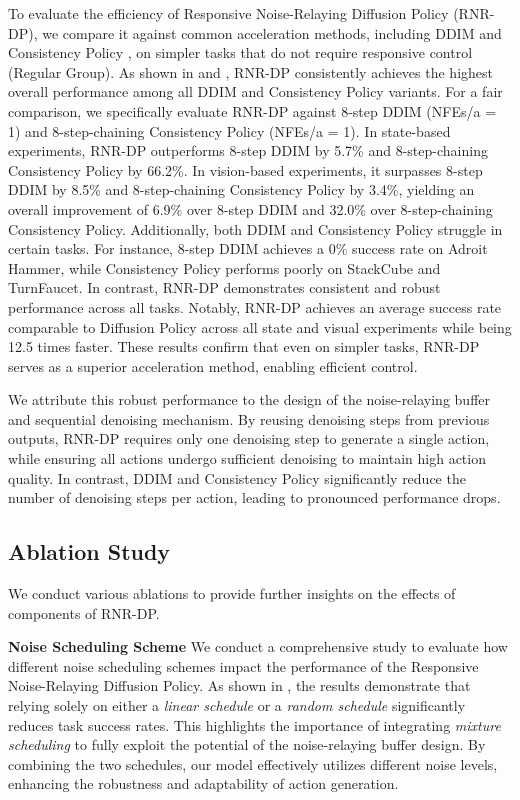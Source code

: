 To evaluate the efficiency of Responsive Noise-Relaying Diffusion Policy (RNR-DP), we compare it against common acceleration methods, including DDIM \citep{chi2023diffusion} and Consistency Policy \citep{prasad2024consistency}, on simpler tasks that do not require responsive control (Regular Group). As shown in  and , RNR-DP consistently achieves the highest overall performance among all DDIM and Consistency Policy variants. For a fair comparison, we specifically evaluate RNR-DP against 8-step DDIM (NFEs/a = 1) and 8-step-chaining Consistency Policy (NFEs/a = 1). In state-based experiments, RNR-DP outperforms 8-step DDIM by 5.7\% and 8-step-chaining Consistency Policy by 66.2\%. In vision-based experiments, it surpasses 8-step DDIM by 8.5\% and 8-step-chaining Consistency Policy by 3.4\%, yielding an overall improvement of 6.9\% over 8-step DDIM and 32.0\% over 8-step-chaining Consistency Policy. Additionally, both DDIM and Consistency Policy struggle in certain tasks. For instance, 8-step DDIM achieves a $0\%$ success rate on Adroit Hammer, while Consistency Policy performs poorly on StackCube and TurnFaucet. In contrast, RNR-DP demonstrates consistent and robust performance across all tasks. Notably, RNR-DP achieves an average success rate comparable to Diffusion Policy across all state and visual experiments while being 12.5 times faster. These results confirm that even on simpler tasks, RNR-DP serves as a superior acceleration method, enabling efficient control.


We attribute this robust performance to the design of the noise-relaying buffer and sequential denoising mechanism. By reusing denoising steps from previous outputs, RNR-DP requires only one denoising step to generate a single action, while ensuring all actions undergo sufficient denoising to maintain high action quality. In contrast, DDIM and Consistency Policy significantly reduce the number of denoising steps per action, leading to pronounced performance drops.



\subsection{Ablation Study}
\label{sec:ablation}

We conduct various ablations to provide further insights on the effects of components of RNR-DP.

\textbf{Noise Scheduling Scheme}
We conduct a comprehensive study to evaluate how different noise scheduling schemes impact the performance of the Responsive Noise-Relaying Diffusion Policy. As shown in , the results demonstrate that relying solely on either a \emph{linear schedule} or a \emph{random schedule} significantly reduces task success rates. This highlights the importance of integrating \emph{mixture scheduling} to fully exploit the potential of the noise-relaying buffer design. By combining the two schedules, our model effectively utilizes different noise levels, enhancing the robustness and adaptability of action generation.

